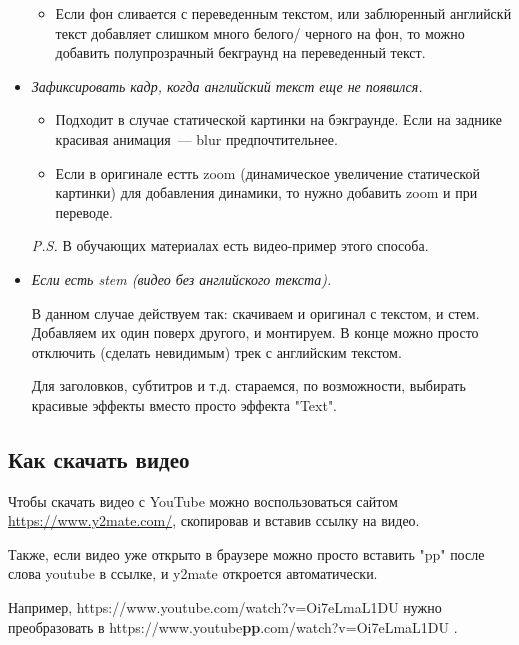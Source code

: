 \documentclass[
a4paper, %
12pt, %
article,
onecolumn, %
openany, %
]{memoir}
\begin{document}
\begin{itemize}
\begin{itemize}
          \item Если фон сливается с переведенным текстом,
                или заблюренный английскй текст
                добавляет слишком много белого/ черного на фон, то
                можно добавить полупрозрачный бекграунд на переведенный текст.
        \end{itemize}

  \item \emph{Зафиксировать кадр, когда английский текст еще не появился.}

        \begin{itemize}
          \item Подходит в случае статической картинки на бэкграунде. Если
                на заднике красивая анимация~--- blur предпочтительнее.

          \item Если в оригинале естть zoom (динамическое увеличение
                статической картинки) для добавления динамики, то нужно
                добавить zoom и при переводе.

        \end{itemize}
        \textit{P.S.} В обучающих материалах есть видео-пример этого способа.

  \item \emph{Если есть stem (видео без английского текста).}

        В данном случае действуем так: скачиваем и оригинал с текстом,
        и стем. Добавляем их один поверх другого, и монтируем. В конце
        можно просто отключить (сделать невидимым) трек
        с английским текстом.

        Для заголовков, субтитров и т.д. стараемся, по возможности,
        выбирать красивые эффекты вместо просто эффекта "Text".
\end{itemize}

\subsection{Как скачать видео}
Чтобы скачать видео с YouTube можно воспользоваться сайтом
\href{https://www.y2mate.com/}{https://www.y2mate.com/}, скопировав и вставив
ссылку на видео.

Также, если видео уже открыто в браузере можно просто вставить "pp" после
слова youtube в ссылке, и y2mate откроется автоматически.

Например, https://www.youtube.com/watch?v=Oi7eLmaL1DU нужно преобразовать
в https://www.youtube\textbf{pp}.com/watch?v=Oi7eLmaL1DU .
\end{document}
